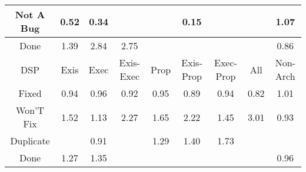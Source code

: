 \begin{tabular}{|c||c|c|c|c|c|c|c|c|}
\hline
Not A Bug & \cellcolor[rgb]{0.8311099406514436,0.4665870524168332,0.3463692779413474} 0.52 & \cellcolor[rgb]{0.8016773851966355,0.3272729565974079,0.3188988928501931} 0.34 &  &  & \cellcolor[rgb]{0.7702342395986459,0.17844206743359048,0.2895519569587362} 0.15 &  &  & \cellcolor[rgb]{0.9075615867290567,0.8388449621348163,0.42} 1.07 \\ 
\hline
Done & \cellcolor[rgb]{0.8969660408265735,0.8338260193389032,0.42} 1.39 & \cellcolor[rgb]{0.8480130558680349,0.8106377633059112,0.41999999999999993} 2.84 & \cellcolor[rgb]{0.851129573566163,0.8121140085313403,0.41999999999999993} 2.75 &  &  &  &  & \cellcolor[rgb]{0.8870778986410783,0.7315020535677708,0.3986060387316731} 0.86 \\ 
\hline
\hline
DSP & Exis & Exec & Exis-Exec & Prop & Exis-Prop & Exec-Prop & All & Non-Arch \\ 
\hline
Fixed & \cellcolor[rgb]{0.8997426308879249,0.7914484528695115,0.41042645549539664} 0.94 & \cellcolor[rgb]{0.9033253260413782,0.8084065432625231,0.4137703043052862} 0.96 & \cellcolor[rgb]{0.8962397355631024,0.7748680816653517,0.40715708652556226} 0.92 & \cellcolor[rgb]{0.9009870254910449,0.7973385873242791,0.41158789045830857} 0.95 & \cellcolor[rgb]{0.8917252081592466,0.7534993186204341,0.40294352761529684} 0.89 & \cellcolor[rgb]{0.8996000956128657,0.7907737859008976,0.41029342257200796} 0.94 & \cellcolor[rgb]{0.8809459869932456,0.7024776717680288,0.39288292119369583} 0.82 & \cellcolor[rgb]{0.909691585223385,0.8398539087900245,0.42} 1.01 \\ 
\hline
Won'T Fix & \cellcolor[rgb]{0.8926006190281854,0.8317581879607194,0.42} 1.52 & \cellcolor[rgb]{0.9056800153915401,0.8379536915012558,0.42} 1.13 & \cellcolor[rgb]{0.8673415403953019,0.8197933612398798,0.42} 2.27 & \cellcolor[rgb]{0.8880958975300564,0.8296243725142372,0.42} 1.65 & \cellcolor[rgb]{0.868921725517775,0.820541869982104,0.42} 2.22 & \cellcolor[rgb]{0.8947119997532927,0.8327583156726123,0.42} 1.45 & \cellcolor[rgb]{0.8422951574578532,0.8079292851116147,0.42} 3.01 & \cellcolor[rgb]{0.8988223629305893,0.7870925178714553,0.40956753873521656} 0.93 \\ 
\hline
Duplicate &  & \cellcolor[rgb]{0.8946009686065282,0.7671112514042331,0.40562757069942623} 0.91 &  & \cellcolor[rgb]{0.9001104890998263,0.8353154948367597,0.41999999999999993} 1.29 & \cellcolor[rgb]{0.8965642297352616,0.8336356877693344,0.42} 1.40 & \cellcolor[rgb]{0.8854312049489523,0.8283621497126616,0.42} 1.73 &  &  \\ 
\hline
Done & \cellcolor[rgb]{0.9008814741939186,0.8356806983023825,0.42} 1.27 & \cellcolor[rgb]{0.8980795813948623,0.834353485923882,0.42} 1.35 &  &  &  &  &  & \cellcolor[rgb]{0.9027017824576363,0.8054551036328119,0.41318833029379387} 0.96 \\ 

\end{tabular}
